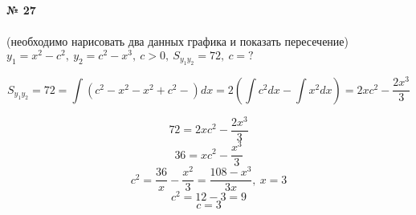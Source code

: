 \documentclass{article}
\begin{document}
\textbf{№ 27} 
\\
\\
(необходимо нарисовать два данных графика и показать пересечение) \\
$ y_1 = x^2-c^2, \ y_2 = c^2-x^3, \ c>0, \ S_{y_1y_2}=72, \ c=? $

$$ S_{y_1y_2}
= 72
= \int \left( c^2-x^2-x^2+c^2- \right)dx 
= 2\left( \int c^2dx - \int x^2dx \right)
= 2xc^2 - \frac{2x^3}{3} $$

$$ 72 = 2xc^2 - \frac{2x^3}{3} $$
$$ 36 = xc^2 - \frac{x^3}{3} $$
$$ c^2 = \frac{36}{x} - \frac{x^2}{3} = \frac{108-x^3}{3x}, \ x=3 $$
$$ c^2 = 12 - 3 = 9$$
$$ c = 3 $$
\end{document}
